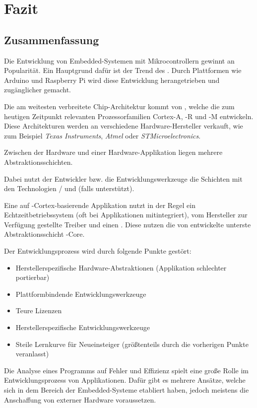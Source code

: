 \section{Fazit}

    \subsection{Zusammenfassung}
    Die Entwicklung von Embedded-Systemen mit Mikrocontrollern gewinnt an Popularität. Ein Hauptgrund dafür ist der
    Trend des . Durch Plattformen wie Arduino und Raspberry Pi wird diese Entwicklung
    herangetrieben und zugänglicher gemacht.

    Die am weitesten verbreitete Chip-Architektur kommt von , welche die zum heutigen Zeitpunkt relevanten
    Prozessorfamilien Cortex-A, -R und -M entwickeln. Diese Architekturen werden an verschiedene Hardware-Hersteller
    verkauft, wie zum Beispiel \textit{Texas Instruments}, \textit{Atmel} oder \textit{STMicroelectronics}.

    Zwischen der Hardware und einer Hardware-Applikation liegen mehrere Abstraktionsschichten.

    Dabei nutzt der Entwickler bzw. die Entwicklungswerkzeuge die Schichten mit den Technologien / und 
    (falls unterstützt).

    Eine auf -Cortex-basierende Applikation nutzt in der Regel ein Echtzeitbetriebssystem (oft bei Applikationen
    mitintegriert), vom Hersteller zur Verfügung gestellte Treiber und einen .
    Diese nutzen die von  entwickelte unterste Abstraktionsschicht -Core.

    Der Entwicklungsprozess wird durch folgende Punkte gestört:
    \begin{itemize}
        \item Herstellerspezifische Hardware-Abstraktionen (Applikation schlechter portierbar)
        \item Plattformbindende Entwicklungswerkzeuge
        \item Teure Lizenzen
        \item Herstellerspezifische Entwicklungswerkzeuge
        \item Steile Lernkurve für Neueinsteiger (größtenteils durch die vorherigen Punkte veranlasst)
    \end{itemize}

    Die Analyse eines Programms auf Fehler und Effizienz spielt eine große Rolle im Entwicklungsprozess von
    Applikationen. Dafür gibt es mehrere Ansätze, welche sich in dem Bereich der Embedded-Systeme etabliert haben,
    jedoch meistens die Anschaffung von externer Hardware voraussetzen.

